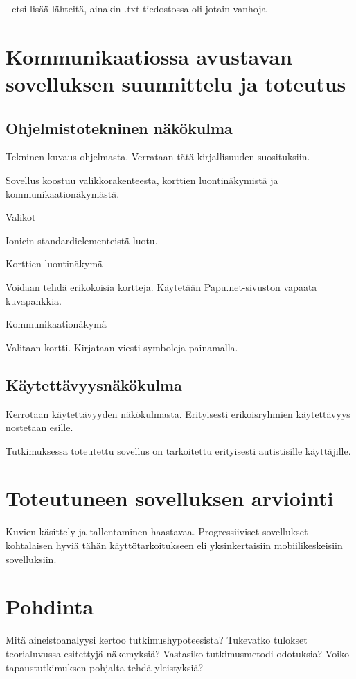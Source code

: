 \documentclass[utf8]{gradu3}
\begin{document}
- etsi lisää lähteitä, ainakin .txt-tiedostossa oli jotain vanhoja

\chapter{Kommunikaatiossa avustavan sovelluksen suunnittelu ja toteutus}

\section{Ohjelmistotekninen näkökulma}
Tekninen kuvaus ohjelmasta. Verrataan tätä kirjallisuuden suosituksiin.

Sovellus koostuu valikkorakenteesta, korttien luontinäkymistä ja kommunikaationäkymästä.

Valikot

Ionicin standardielementeistä luotu.

Korttien luontinäkymä

Voidaan tehdä erikokoisia kortteja. Käytetään Papu.net-sivuston vapaata kuvapankkia.

Kommunikaationäkymä

Valitaan kortti. Kirjataan viesti symboleja painamalla.

\section{Käytettävyysnäkökulma}

Kerrotaan käytettävyyden näkökulmasta. Erityisesti erikoisryhmien käytettävyys nostetaan esille.

Tutkimuksessa toteutettu sovellus on tarkoitettu erityisesti autistisille käyttäjille.

\chapter{Toteutuneen sovelluksen arviointi}

Kuvien käsittely ja tallentaminen haastavaa. Progressiiviset sovellukset kohtalaisen hyviä tähän käyttötarkoitukseen eli yksinkertaisiin mobiilikeskeisiin sovelluksiin.


\chapter{Pohdinta}

Mitä aineistoanalyysi kertoo tutkimushypoteesista? Tukevatko tulokset teorialuvussa esitettyjä näkemyksiä? Vastasiko tutkimusmetodi odotuksia? Voiko tapaustutkimuksen pohjalta tehdä yleistyksiä?
\end{document}
